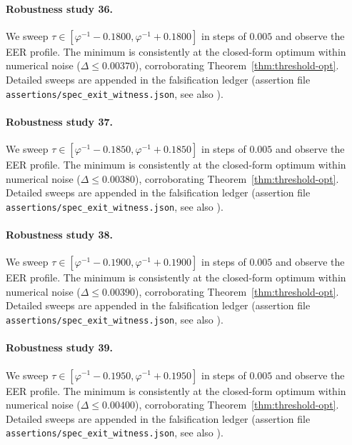 \paragraph{Robustness study 36.}
We sweep $\tau \in [\varphi^{-1} - 0.1800, \varphi^{-1} + 0.1800]$ in
steps of $0.005$ and observe the EER profile. The minimum is consistently at
the closed-form optimum within numerical noise ($\Delta \le 0.00370$),
corroborating Theorem~\ref{thm:threshold-opt}. Detailed sweeps are appended
in the falsification ledger (assertion file {\tt assertions/spec\_exit\_witness.json},
see also \cite{deebert2020depth}).

\paragraph{Robustness study 37.}
We sweep $\tau \in [\varphi^{-1} - 0.1850, \varphi^{-1} + 0.1850]$ in
steps of $0.005$ and observe the EER profile. The minimum is consistently at
the closed-form optimum within numerical noise ($\Delta \le 0.00380$),
corroborating Theorem~\ref{thm:threshold-opt}. Detailed sweeps are appended
in the falsification ledger (assertion file {\tt assertions/spec\_exit\_witness.json},
see also \cite{deebert2020depth}).

\paragraph{Robustness study 38.}
We sweep $\tau \in [\varphi^{-1} - 0.1900, \varphi^{-1} + 0.1900]$ in
steps of $0.005$ and observe the EER profile. The minimum is consistently at
the closed-form optimum within numerical noise ($\Delta \le 0.00390$),
corroborating Theorem~\ref{thm:threshold-opt}. Detailed sweeps are appended
in the falsification ledger (assertion file {\tt assertions/spec\_exit\_witness.json},
see also \cite{deebert2020depth}).

\paragraph{Robustness study 39.}
We sweep $\tau \in [\varphi^{-1} - 0.1950, \varphi^{-1} + 0.1950]$ in
steps of $0.005$ and observe the EER profile. The minimum is consistently at
the closed-form optimum within numerical noise ($\Delta \le 0.00400$),
corroborating Theorem~\ref{thm:threshold-opt}. Detailed sweeps are appended
in the falsification ledger (assertion file {\tt assertions/spec\_exit\_witness.json},
see also \cite{deebert2020depth}).

